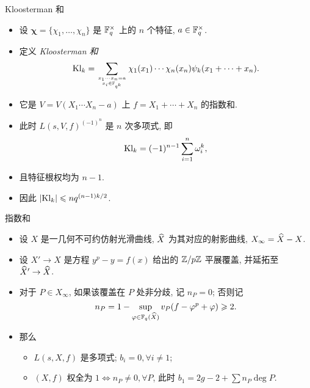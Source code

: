 \documentclass[aspectratio=169,handout]{ctexbeamer}
\newcommand\bchi{{\boldsymbol\chi}}
\begin{document}
\begin{frame}{Kloosterman 和}
	\beqskip{4pt}
	\onslide<+->
	\begin{example}
		\begin{itemize}
			\item 设 $\bchi=\{\chi_1,\dots,\chi_n\}$ 是 ${\mathbb{F}}_q^\times$ 上的 $n$ 个特征, $a\in{\mathbb{F}}_q^\times$.
			\item 定义 \emph{Kloosterman 和}
			\[
				{\mathrm{Kl}}_k=\sum_{x_1\cdots x_n=a\atop x_i\in{\mathbb{F}}_{q^k}}\chi_1(x_1)\cdots\chi_n(x_n)\psi_k(x_1+\cdots+x_n).
			\]
			\item 它是 $V=V(X_1\cdots X_n-a)$ 上 $f=X_1+\cdots+X_n$ 的指数和.
			\item 此时 $L(s,V,f)^{(-1)^n}$ 是 $n$ 次多项式, 即
			\[
				{\mathrm{Kl}}_k=(-1)^{n-1}\sum_{i=1}^n \omega_i^k,
			\]
			\item 且特征根权均为 $n-1$.
			\item 因此 $|{\mathrm{Kl}}_k|\leqslant nq^{(n-1)k/2}$.
		\end{itemize}
	\end{example}
	\endgroup
\end{frame}


\begin{frame}{指数和}
	\onslide<+->
	\begin{example}[leftupper=0pt][Serre1977]
		\begin{itemize}
			\item 设 $X$ 是一几何不可约仿射光滑曲线, $\widehat X$ 为其对应的射影曲线, $X_\infty=\widehat X-X$.
			\item 设 $X'\to X$ 是方程 $y^p-y=f(x)$ 给出的 ${\mathbb{Z}}/p{\mathbb{Z}}$ 平展覆盖, 并延拓至 $\widehat X'\to \widehat X$.
			\item 对于 $P\in X_\infty$, 如果该覆盖在 $P$ 处非分歧, 记 $n_P=0$; 否则记
			\[
				n_P=1-\sup_{\varphi\in{\mathbb{F}}_q(\widehat X)} v_P(f-\varphi^p+\varphi)\geqslant 2.
			\]
			\item 那么
			\begin{itemize}
				\item $L(s,X,f)$ 是多项式; $b_i=0, \forall i\neq 1$;
				\item $(X,f)$ 权全为 $1 \iff n_P\neq 0,\forall P$, 此时 $b_1=2g-2+\sum n_P\deg P$.
			\end{itemize}
		\end{itemize}
	\end{example}
\end{frame}
\end{document}
